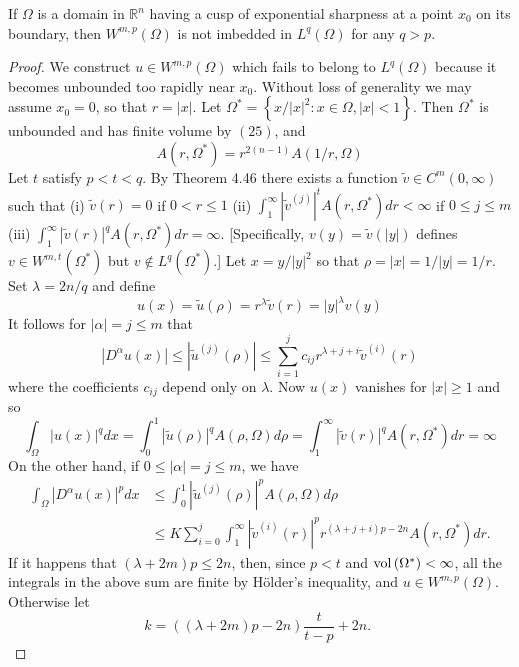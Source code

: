 \begin{theorem}
  If $\Omega$ is a domain in $\mathbb{R}^n$ having a cusp of exponential sharpness at a point $x_0$ on its boundary, then $W^{m,p}(\Omega)$ is not imbedded in $L^q(\Omega)$ for any $q>p$.
\end{theorem}

\begin{proof}
  We construct $u \in W^{m, p}(\Omega)$ which fails to belong to $L^q(\Omega)$ because
  it becomes unbounded too rapidly near $x_0$. Without loss of generality we may assume $x_0=0$, 
  so that $r=|x|$. Let $\Omega^*=\left\{x /|x|^2: x \in \Omega,|x|<1\right\}$.
  Then $\Omega^*$ is unbounded and has finite volume by $(25)$, and
  \[
  A\left(r, \Omega^*\right)=r^{2(n-1)} A(1 / r, \Omega)
  \]
  Let $t$ satisfy $p<t<q$. By Theorem 4.46 there exists a
  function $\tilde{v} \in C^m(0, \infty)$ such that
  (i) $\tilde{v}(r)=0$ if $0<r \leq 1$
  (ii) $\int_1^{\infty}\left|\tilde{v}^{(j)}\right|^t A\left(r, \Omega^*\right) d r<\infty$ if $0 \leq j \leq m$
  (iii) $\int_1^{\infty}|\tilde{v}(r)|^q A\left(r, \Omega^*\right) d r=\infty$.
  [Specifically, $v(y)=\tilde{v}(|y|)$ defines $v \in W^{m, t}\left(\Omega^*\right)$ but $v \notin L^q\left(\Omega^*\right)$.] Let $x=y /|y|^2$ so that $\rho=|x|=1 /|y|=1 / r$. Set $\lambda=2 n / q$ and define
  \[
  u(x)=\tilde{u}(\rho)=r^\lambda \tilde{v}(r)=|y|^\lambda v(y)
  \]
  It follows for $|\alpha|=j \leq m$ that
  \[
  \left|D^\alpha u(x)\right| \leq\left|\tilde{u}^{(j)}(\rho)\right| \leq \sum_{i=1}^j c_{i j} r^{\lambda+j+i} \tilde{v}^{(i)}(r)
  \]
  where the coefficients $c_{i j}$ depend only on $\lambda$. Now $u(x)$ vanishes for $|x| \geq 1$ and so
  \[
  \int_{\Omega}|u(x)|^q d x=\int_0^1|\tilde{u}(\rho)|^q A(\rho, \Omega) d \rho=\int_1^{\infty}|\tilde{v}(r)|^q A\left(r, \Omega^*\right) d r=\infty
  \]
  On the other hand, if $0 \leq|\alpha|=j \leq m$, we have
  \[
  \begin{aligned}
  \int_{\Omega}\left|D^\alpha u(x)\right|^p d x & \leq \int_0^1\left|\tilde{u}^{(j)}(\rho)\right|^p A(\rho, \Omega) d \rho \\
  & \leq K \sum_{i=0}^j \int_1^{\infty}\left|\tilde{v}^{(i)}(r)\right|^p r^{(\lambda+j+i) p-2 n} A\left(r, \Omega^*\right) d r .
  \end{aligned}
  \]
  If it happens that $(\lambda+2 m) p \leq 2 n$, then, since $p<t$ and $\operatorname{vol}\left(\Omega^*\right)<\infty$, all the integrals in the above sum are finite by Hölder's inequality, and $u \in W^{m, p}(\Omega)$. Otherwise let
  \[
  k=((\lambda+2 m) p-2 n) \frac{t}{t-p}+2 n \text {. }
\]
\end{proof}
